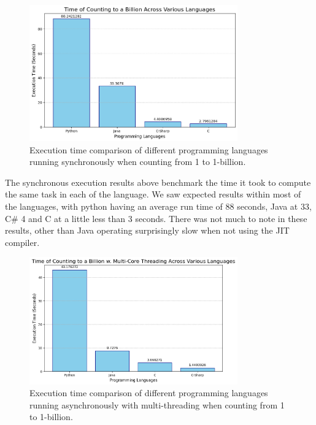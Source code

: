 \documentclass[12pt,a4paper]{article}
\begin{document}
\begin{figure}[!htb]
    \centering
    \includegraphics[width=0.8\textwidth]{../sync_records/sync_exec_times.png}
    \captionsetup{font=tiny, justification=centering}
    \caption{Execution time comparison of different programming languages running synchronously when counting from 1 to 1-billion.}
    \label{fig:sync-exec-times}
\end{figure}

The synchronous execution results above benchmark the time it took to compute the same task in each of the language. We saw expected results within most of the languages, with python having an average run time of 88 seconds, Java at 33, C\# 4 and C at a little less than 3 seconds. There was not much to note in these results, other than Java operating surprisingly slow when not using the JIT compiler.

\begin{figure}[!htb]
    \centering
    \includegraphics[width=0.8\textwidth]{../async_records/async_exec_times.png}
    \captionsetup{font=tiny, justification=centering}
    \caption{Execution time comparison of different programming languages running asynchronously with multi-threading when counting from 1 to 1-billion.}
    \label{fig:async-exec-times}
\end{figure}
\end{document}
